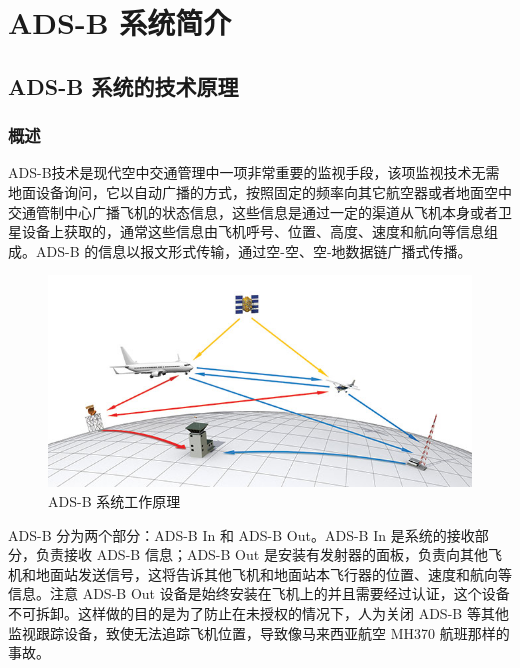 
\chapter{\acs{ADS-B} 系统简介}

\section{ADS-B 系统的技术原理}

\subsection{概述}

ADS-B技术是现代空中交通管理中一项非常重要的监视手段，该项监视技术无需地面设备询问，它以自动广播的方式，按照固定的频率向其它航空器或者地面空中交通管制中心广播飞机的状态信息，这些信息是通过一定的渠道从飞机本身或者卫星设备上获取的，通常这些信息由飞机呼号、位置、高度、速度和航向等信息组成。ADS-B 的信息以报文形式传输，通过空-空、空-地数据链广播式传播。

\begin{figure}[!htb]
\centering
\includegraphics[width=13cm]{pic/Advocacy_ADS_B.jpg}
\caption{ADS-B 系统工作原理\protect\footnotemark}
\label{fig:Advocacy_ADS_B}
\end{figure}


ADS-B 分为两个部分：ADS-B In 和 ADS-B Out。ADS-B In 是系统的接收部分，负责接收 ADS-B 信息；ADS-B Out 是安装有发射器的面板，负责向其他飞机和地面站发送信号，这将告诉其他飞机和地面站本飞行器的位置、速度和航向等信息。注意 ADS-B Out 设备是始终安装在飞机上的并且需要经过认证，这个设备不可拆卸。这样做的目的是为了防止在未授权的情况下，人为关闭 ADS-B 等其他监视跟踪设备，致使无法追踪飞机位置，导致像马来西亚航空 MH370 航班那样的事故。

